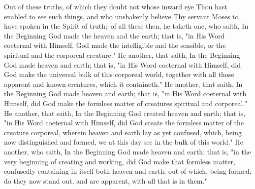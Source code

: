 \documentclass[b5paper,openright,12pt,twoside]{book}
\begin{document}
Out of these truths, of which they doubt not whose inward eye Thou hast
enabled to see such things, and who unshakenly believe Thy servant Moses
to have spoken in the Spirit of truth;--of all these then, he taketh
one, who saith, In the Beginning God made the heaven and the earth; that
is, "in His Word coeternal with Himself, God made the intelligible and
the sensible, or the spiritual and the corporeal creature." He another,
that saith, In the Beginning God made heaven and earth; that is, "in
His Word coeternal with Himself, did God make the universal bulk of this
corporeal world, together with all those apparent and known creatures,
which it containeth." He another, that saith, In the Beginning God made
heaven and earth; that is, "in His Word coeternal with Himself, did
God make the formless matter of creatures spiritual and corporeal." He
another, that saith, In the Beginning God created heaven and earth; that
is, "in His Word coeternal with Himself, did God create the formless
matter of the creature corporeal, wherein heaven and earth lay as yet
confused, which, being now distinguished and formed, we at this day see
in the bulk of this world." He another, who saith, In the Beginning God
made heaven and earth; that is, "in the very beginning of creating and
working, did God make that formless matter, confusedly containing in
itself both heaven and earth; out of which, being formed, do they now
stand out, and are apparent, with all that is in them."
\end{document}
